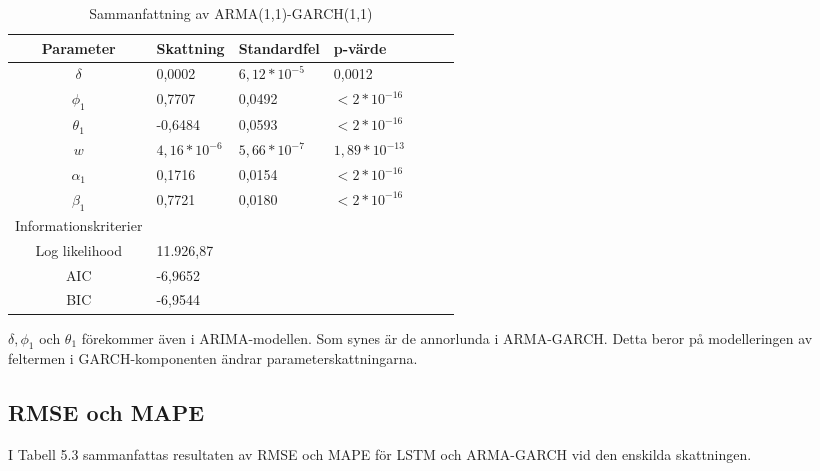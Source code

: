 \documentclass[11pt]{article}
\numberwithin{equation}{section}
\numberwithin{table}{section}
\numberwithin{figure}{section}
\begin{document}
\begin{table}[H]
\caption{Sammanfattning av ARMA(1,1)-GARCH(1,1)}
\begin{tabularx}{\textwidth}{c *{6}{Y}}
\toprule
Parameter  & Skattning & Standardfel & p-värde \\
\hline

$\delta$      & 0,0002         & $6,12*10^{-5}$ & 0,0012           \\
$\phi_1$      & 0,7707         & 0,0492         & $<2*10^{-16}$    \\

$\theta_1$    & -0,6484        & 0,0593         & $<2*10^{-16}$    \\
$w$           & $4,16*10^{-6}$ & $5,66*10^{-7}$ & $1,89*10^{-13}$  \\

$\alpha_1$    & 0,1716         & 0,0154         & $<2*10^{-16}$    \\
$\beta_1$     & 0,7721         & 0,0180         & $<2*10^{-16}$    \\ 
\midrule

Informationskriterier  & &  &  \\
\hline

Log likelihood & 11.926,87       &                &                  \\
AIC            & -6,9652        &                &                   \\

BIC            & -6,9544         &                &                   \\
\bottomrule
\end{tabularx}
\end{table}






$\delta, \phi_1$ och $\theta_1$ förekommer även i ARIMA-modellen. Som synes är de annorlunda i ARMA-GARCH. Detta beror på modelleringen av feltermen i GARCH-komponenten ändrar parameterskattningarna.

\subsection{RMSE och MAPE}
I Tabell 5.3 sammanfattas resultaten av RMSE och MAPE för LSTM och ARMA-GARCH vid den enskilda skattningen.
\end{document}
